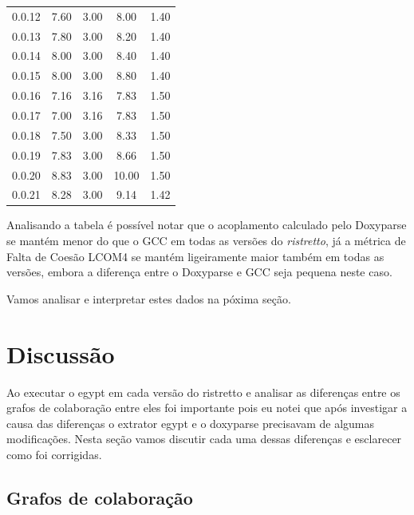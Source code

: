 \begin{table}
\begin{tabular}{| l | c c | c c |}
0.0.12    & 7.60            & 3.00           & 8.00            & 1.40          \\
0.0.13    & 7.80            & 3.00           & 8.20            & 1.40          \\
0.0.14    & 8.00            & 3.00           & 8.40            & 1.40          \\
0.0.15    & 8.00            & 3.00           & 8.80            & 1.40          \\
0.0.16    & 7.16            & 3.16           & 7.83            & 1.50          \\
0.0.17    & 7.00            & 3.16           & 7.83            & 1.50          \\
0.0.18    & 7.50            & 3.00           & 8.33            & 1.50          \\
0.0.19    & 7.83            & 3.00           & 8.66            & 1.50          \\
0.0.20    & 8.83            & 3.00           & 10.00           & 1.50          \\
0.0.21    & 8.28            & 3.00           & 9.14            & 1.42          \\
\hline
\end{tabular}
\label{tab:comparacao-metricas}
\end{table}

Analisando a tabela é possível notar que o acoplamento calculado pelo Doxyparse
se mantém menor do que o GCC em todas as versões do {\it ristretto}, já a métrica de
Falta de Coesão LCOM4 se mantém ligeiramente maior também em todas as versões,
embora a diferença entre o Doxyparse e GCC seja pequena neste caso.

Vamos analisar e interpretar estes dados na póxima seção.

\section{Discussão} \label{sec:discussao}

Ao executar o egypt em cada versão do ristretto e analisar as diferenças entre
os grafos de colaboração entre eles foi importante pois eu notei que após
investigar a causa das diferenças o extrator egypt e o doxyparse precisavam de
algumas modificações. Nesta seção vamos discutir cada uma dessas diferenças e
esclarecer como foi corrigidas.

\subsection{Grafos de colaboração}

